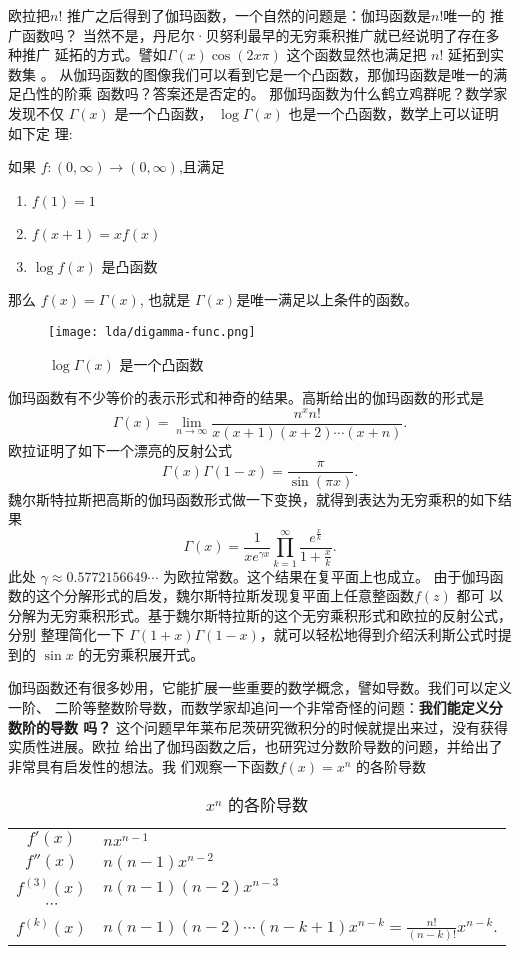 {欧拉把$n!$ 推广之后得到了伽玛函数，一个自然的问题是：伽玛函数是$n!$唯一的
推广函数吗？ 当然不是，丹尼尔·贝努利最早的无穷乘积推广就已经说明了存在多种推广
延拓的方式。譬如$\Gamma(x) \cos (2x\pi)$ 这个函数显然也满足把 $n!$ 延拓到实数集
。 从伽玛函数的图像我们可以看到它是一个凸函数，那伽玛函数是唯一的满足凸性的阶乘
函数吗？答案还是否定的。 那伽玛函数为什么鹤立鸡群呢？数学家发现不仅
$\Gamma(x)$ 是一个凸函数， $\log\Gamma(x)$ 也是一个凸函数，数学上可以证明如下定
理:
\begin{theorem} 如果 $f:(0,\infty)\rightarrow (0,\infty)$,且满足
\begin{enumerate}
\item $f(1) = 1$
\item $f(x+1) = xf(x)$
\item $\log f(x)$ 是凸函数
\end{enumerate}
那么 $f(x) = \Gamma(x)$, 也就是 $\Gamma(x)$是唯一满足以上条件的函数。
\end{theorem}

\begin{figure}[htbp]
\centering
\texttt{[image: lda/digamma-func.png]}
\caption{$\log \Gamma(x)$ 是一个凸函数}
\end{figure}

伽玛函数有不少等价的表示形式和神奇的结果。高斯给出的伽玛函数的形式是
$$ \Gamma(x) = \lim_{n\rightarrow\infty} \frac{n^x n!}{x(x+1)(x+2)\cdots(x+n)} .$$
欧拉证明了如下一个漂亮的反射公式
$$ \Gamma(x) \Gamma(1-x) = \frac{\pi}{\sin (\pi x)} .$$
魏尔斯特拉斯把高斯的伽玛函数形式做一下变换，就得到表达为无穷乘积的如下结果
$$ {\Gamma(x)} = \frac{1}{xe^{\gamma x}} \prod_{k=1}^\infty
\frac{e^{\frac{x}{k}}} {1+\frac{x}{k}} .$$
此处 $\gamma \approx 0.5772156649\cdots$ 为欧拉常数。这个结果在复平面上也成立。
由于伽玛函数的这个分解形式的启发，魏尔斯特拉斯发现复平面上任意整函数$f(z)$ 都可
以分解为无穷乘积形式。基于魏尔斯特拉斯的这个无穷乘积形式和欧拉的反射公式，分别
整理简化一下 $\Gamma(1+x)\Gamma(1-x)$，就可以轻松地得到介绍沃利斯公式时提到的
$\sin x$ 的无穷乘积展开式。 

伽玛函数还有很多妙用，它能扩展一些重要的数学概念，譬如导数。我们可以定义一阶、
二阶等整数阶导数，而数学家却追问一个非常奇怪的问题：{\bf 我们能定义分数阶的导数
吗？} 这个问题早年莱布尼茨研究微积分的时候就提出来过，没有获得实质性进展。欧拉
给出了伽玛函数之后，也研究过分数阶导数的问题，并给出了非常具有启发性的想法。我
们观察一下函数$f(x) = x^n$ 的各阶导数

\begin{table}[H]
\centering
\caption{$x^n$ 的各阶导数}
\begin{tabular*}{0.8\textwidth}{@{\extracolsep{\fill}}cl}
\\
$f'(x)$ & $nx^{n-1}$ \\
$f''(x)$ & $n(n-1)x^{n-2}$ \\
$f^{(3)}(x)$ & $n(n-1)(n-2)x^{n-3}$ \\
$\cdots$ &  \\
$f^{(k)}(x)$ & $n(n-1)(n-2)\cdots(n-k+1)x^{n-k} = \frac{n!}{(n-k)!} x^{n-k}$. 
\end{tabular*}
\end{table}

}
